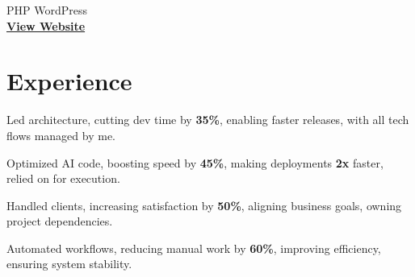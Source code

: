 \documentclass[]{deedy-resume-openfont}
\begin{document}
\begin{minipage}[t]{0.33\textwidth}
    \vspace{6pt}  
    \textbullet{} PHP \textbullet{} WordPress \\  
    \href{http://classiccommercialfinance.com/}{\bf View Website}  




    \end{minipage} 
    \hfill
    \begin{minipage}[t]{0.66\textwidth} 


    \section{Experience}
    \vspace{1em} %

    \vspace{1em} %

    \vspace{1em}  
    
    \vspace{1em}  
    \begin{tightemize}  
        \item Led architecture, cutting dev time by \textbf{35\%}, enabling faster releases, with all tech flows managed by me.  
        \item Optimized AI code, boosting speed by \textbf{45\%}, making deployments \textbf{2x} faster, relied on for execution.  
        \item Handled clients, increasing satisfaction by \textbf{50\%}, aligning business goals, owning project dependencies.  
        \item Automated workflows, reducing manual work by \textbf{60\%}, improving efficiency, ensuring system stability.  
    \end{tightemize}  
    \vspace{0.5em}  
    

\end{minipage}
\end{document}
